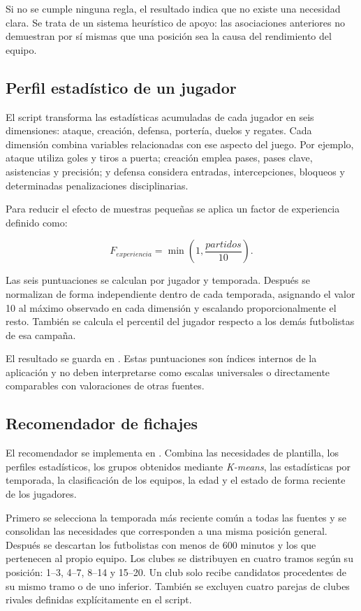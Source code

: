 Si no se cumple ninguna regla, el resultado indica que no existe una necesidad clara. Se trata de un sistema heurístico de apoyo: las asociaciones anteriores no demuestran por sí mismas que una posición sea la causa del rendimiento del equipo.

\subsection{Perfil estadístico de un jugador}

El script  transforma las estadísticas acumuladas de cada jugador en seis dimensiones: ataque, creación, defensa, portería, duelos y regates. Cada dimensión combina variables relacionadas con ese aspecto del juego. Por ejemplo, ataque utiliza goles y tiros a puerta; creación emplea pases, pases clave, asistencias y precisión; y defensa considera entradas, intercepciones, bloqueos y determinadas penalizaciones disciplinarias.

Para reducir el efecto de muestras pequeñas se aplica un factor de experiencia definido como:

\begin{equation}
    F_{experiencia}=\min\left(1,\frac{partidos}{10}\right).
\end{equation}

Las seis puntuaciones se calculan por jugador y temporada. Después se normalizan de forma independiente dentro de cada temporada, asignando el valor 10 al máximo observado en cada dimensión y escalando proporcionalmente el resto. También se calcula el percentil del jugador respecto a los demás futbolistas de esa campaña.

El resultado se guarda en . Estas puntuaciones son índices internos de la aplicación y no deben interpretarse como escalas universales o directamente comparables con valoraciones de otras fuentes.

\subsection{Recomendador de fichajes}

El recomendador se implementa en . Combina las necesidades de plantilla, los perfiles estadísticos, los grupos obtenidos mediante \textit{K-means}, las estadísticas por temporada, la clasificación de los equipos, la edad y el estado de forma reciente de los jugadores.

Primero se selecciona la temporada más reciente común a todas las fuentes y se consolidan las necesidades que corresponden a una misma posición general. Después se descartan los futbolistas con menos de 600 minutos y los que pertenecen al propio equipo. Los clubes se distribuyen en cuatro tramos según su posición: 1--3, 4--7, 8--14 y 15--20. Un club solo recibe candidatos procedentes de su mismo tramo o de uno inferior. También se excluyen cuatro parejas de clubes rivales definidas explícitamente en el script.

